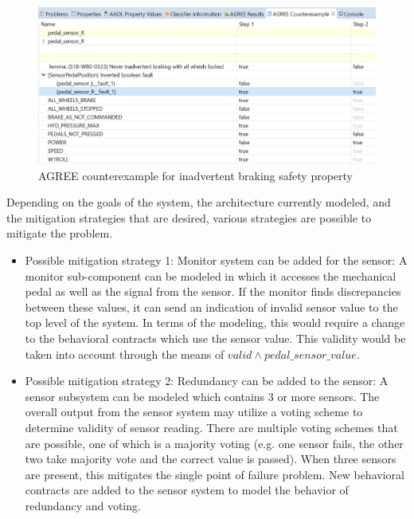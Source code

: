\begin{figure}[htbp]
	\begin{center}
		\includegraphics[width=\textwidth]{images/counterexample.png}
	\end{center}
	\vspace{-0.3in}
	\caption{AGREE counterexample for inadvertent braking safety property}
	\label{fig:counterexample}
\end{figure} 

Depending on the goals of the system, the architecture currently modeled, and the mitigation strategies that are desired, various strategies are possible to mitigate the problem.

\begin{itemize}
\item Possible mitigation strategy 1: Monitor system can be added for the sensor: A monitor sub-component can be modeled in which it accesses the mechanical pedal as well as the signal from the sensor. If the monitor finds discrepancies between these values, it can send an indication of invalid sensor value to the top level of the system. In terms of the modeling, this would require a change to the behavioral contracts which use the sensor value. This validity would be taken into account through the means of $valid \land pedal\_sensor\_value$. 

\item Possible mitigation strategy 2: Redundancy can be added to the sensor: A sensor subsystem can be modeled which contains 3 or more sensors. The overall output from the sensor system may utilize a voting scheme to determine validity of sensor reading. There are multiple voting schemes that are possible, one of which is a majority voting (e.g. one sensor fails, the other two take majority vote and the correct value is passed). 
When three sensors are present, this mitigates the single point of failure problem. New behavioral contracts are added to the sensor system to model the behavior of redundancy and voting. 
\end{itemize}

